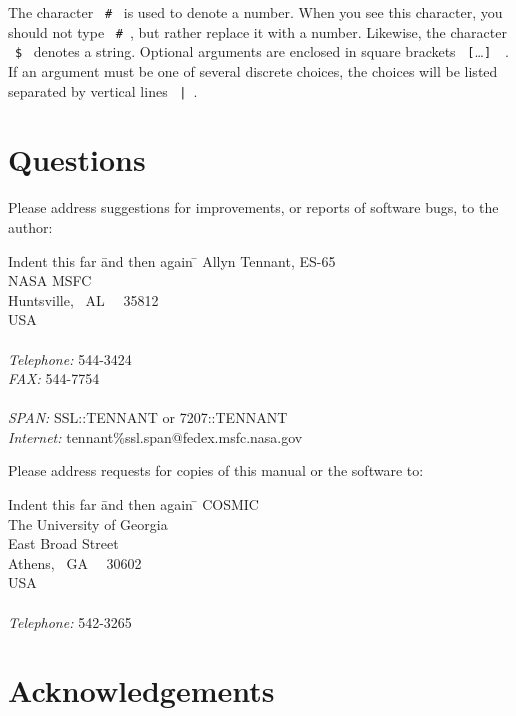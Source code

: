 The character \ {\tt \#} \ is used to denote a number.
When you see this character, you should not type \ {\tt \#}~,
but rather replace it with a number.
Likewise, the character \ {\tt \$} \ denotes a string.
Optional arguments are enclosed in square brackets
\ {\tt [}\ldots {\tt ]}~\ \@.
If an argument must be one of several discrete choices,
the choices will be listed separated by vertical lines \ {\tt |}~.

\section{Questions}

Please address suggestions for improvements,
or reports of software bugs, to the author:

\begin{tabbing}
Indent this far \=  and then again \= \kill
\> \> Allyn Tennant, ES-65\\
\> \> NASA MSFC\\
\> \> Huntsville, \ AL \ \ 35812\\
\> \> USA\\
\> \> \\
\> {\it Telephone:}  544-3424\\
\> {\it FAX:}        544-7754\\
\> \> \\
\> {\it SPAN:}      \> SSL::TENNANT or 7207::TENNANT\\
\> {\it Internet:}  \> tennant\%ssl.span@fedex.msfc.nasa.gov\\
\end{tabbing}

\noindent
Please address requests for copies of this manual or the software to:

\begin{tabbing}
Indent this far \=  and then again \= \kill
\> \> COSMIC\\
\> \> The University of Georgia\\
\>  East Broad Street\\
\> \> Athens, \ GA \ \ 30602\\
\> \> USA\\
\> \> \\
\> {\it Telephone:}  542-3265\\
\end{tabbing}

\section{Acknowledgements}

